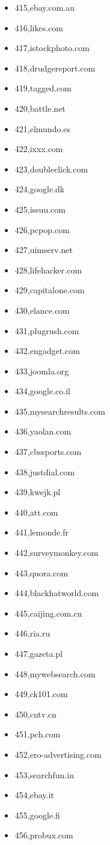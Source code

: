 \begin{multicols}{3}
\begin{itemize}
	\item 415,ebay.com.au
	\item 416,likes.com
	\item 417,istockphoto.com
	\item 418,drudgereport.com
	\item 419,tagged.com
	\item 420,battle.net
	\item 421,elmundo.es
	\item 422,ixxx.com
	\item 423,doubleclick.com
	\item 424,google.dk
	\item 425,issuu.com
	\item 426,pcpop.com
	\item 427,uimserv.net
	\item 428,lifehacker.com
	\item 429,capitalone.com
	\item 430,elance.com
	\item 431,plugrush.com
	\item 432,engadget.com
	\item 433,joomla.org
	\item 434,google.co.il
	\item 435,mysearchresults.com
	\item 436,yaolan.com
	\item 437,cbssports.com
	\item 438,justdial.com
	\item 439,kwejk.pl
	\item 440,att.com
	\item 441,lemonde.fr
	\item 442,surveymonkey.com
	\item 443,quora.com
	\item 444,blackhatworld.com
	\item 445,caijing.com.cn
	\item 446,ria.ru
	\item 447,gazeta.pl
	\item 448,mywebsearch.com
	\item 449,ck101.com
	\item 450,cntv.cn
	\item 451,pch.com
	\item 452,ero-advertising.com
	\item 453,searchfun.in
	\item 454,ebay.it
	\item 455,google.fi
	\item 456,probux.com

\end{itemize}
\end{multicols}
